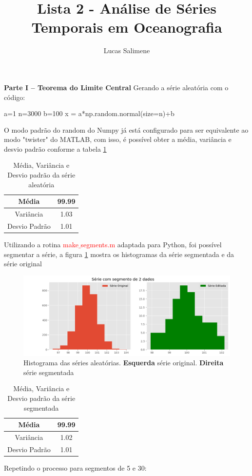 \documentclass[12pt,a4paper,portuguese]{article}
\title{Lista 2 - Análise de Séries Temporais em Oceanografia}
\author{Lucas Salimene}
\date{}
\begin{document}
	\maketitle
	\newpage
	\textbf{Parte I – Teorema do Limite Central}
	Gerando a série aleatória com o código:
	\begin{python}
a=1
n=3000
b=100
x = a*np.random.normal(size=n)+b
	\end{python}
O modo padrão do random do Numpy já está configurado para ser equivalente ao modo "twister" do MATLAB, com isso, é possível obter a média, variância e desvio padrão conforme a tabela \ref{xmvstd}
\begin{table}[H]
\centering
\begin{tabular}{|c|c|}
	\hline
	Média & 99.99 \\
	\hline
	Variância & 1.03 \\
	\hline
	Desvio Padrão & 1.01 \\
	\hline
\end{tabular}
\caption{Média, Variância e Desvio padrão da série aleatória}
\label{xmvstd}
\end{table}
Utilizando a rotina \textcolor{red}{make$\_$segments.m} adaptada para Python, foi possível segmentar a série, a figura \ref{fig:lista2-1c} mostra os histogramas da série segmentada e da série original
\begin{figure}[H]
	\centering
	\includegraphics[width=0.9\linewidth]{lista2-1c}
	\caption{Histograma das séries aleatórias. \textbf{Esquerda} série original. \textbf{Direita} série segmentada}
	\label{fig:lista2-1c}
\end{figure}
	\begin{table}[H]
		\centering
		\begin{tabular}{|c|c|}
			\hline
			Média & 99.99 \\
			\hline
			Variância & 1.02 \\
			\hline
			Desvio Padrão & 1.01 \\
			\hline
		\end{tabular}
		\caption{Média, Variância e Desvio padrão da série segmentada}
		\label{y2}
	\end{table}
Repetindo o processo para segmentos de 5 e 30:
\end{document}
